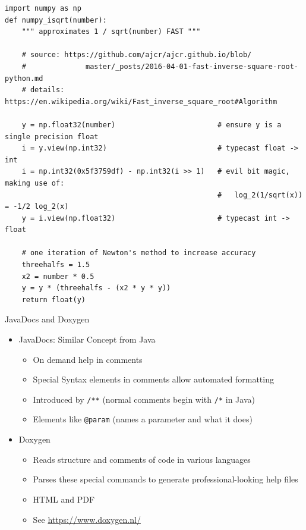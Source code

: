 
\begin{frame}[fragile]
%
\begin{codebox}
\begin{verbatim}
import numpy as np
def numpy_isqrt(number):
    """ approximates 1 / sqrt(number) FAST """
    
    # source: https://github.com/ajcr/ajcr.github.io/blob/
    #              master/_posts/2016-04-01-fast-inverse-square-root-python.md
    # details: https://en.wikipedia.org/wiki/Fast_inverse_square_root#Algorithm
    
    y = np.float32(number)                        # ensure y is a single precision float    
    i = y.view(np.int32)                          # typecast float -> int
    i = np.int32(0x5f3759df) - np.int32(i >> 1)   # evil bit magic, making use of:
                                                  #   log_2(1/sqrt(x)) = -1/2 log_2(x)
    y = i.view(np.float32)                        # typecast int -> float
    
    # one iteration of Newton's method to increase accuracy
    threehalfs = 1.5
    x2 = number * 0.5
    y = y * (threehalfs - (x2 * y * y))
    return float(y)
\end{verbatim}
\end{codebox}
%
\end{frame}


\begin{frame}{JavaDocs and Doxygen}
%
\begin{itemize}
\item JavaDocs: Similar Concept from Java
	\begin{itemize}
	\item On demand help in comments
	\item Special Syntax elements in comments allow automated formatting
	\item Introduced by \texttt{/**} (normal comments begin with \texttt{/*} in Java)
	\item Elements like \texttt{@param} (names a parameter and what it does)
	\end{itemize}
\item Doxygen
	\begin{itemize}
	\item Reads structure and comments of code in various languages
	\item Parses these special commands to generate professional-looking help files
	\item HTML and PDF
	\item See \url{https://www.doxygen.nl/}
	\end{itemize}
\end{itemize}
%
\end{frame}


